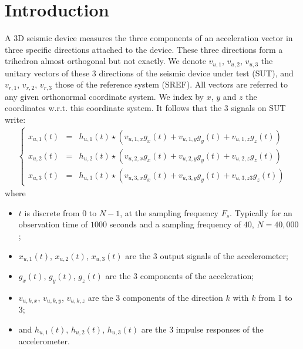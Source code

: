 \documentclass[a4paper, 12pt]{report}
\begin{document}
 \sloppy
\section{Introduction}
A 3D seismic device measures the three components of an acceleration vector in three specific directions attached to the device. These three directions form a trihedron almost orthogonal but not exactly. We denote $v_{u,1}$,  $v_{u,2}$,  $v_{u,3}$ the unitary vectors of these 3 directions of the seismic device under test (SUT), and  $v_{r,1}$,  $v_{r,2}$,  $v_{r,3}$ those of the reference system (SREF). All vectors are referred to any given orthonormal coordinate system. We index by $x$, $y$ and $z$ the coordinates w.r.t. this coordinate system. It follows that the 3 signals on SUT write:
\begin{eqnarray}
\label{eq:signalsT}
\left\{
\begin{array}{rcl}
x_{u,1}(t)&=&h_{u,1}(t)\star (v_{u,1,x}g_{x}(t)+v_{u,1,y}g_{y}(t)+v_{u,1,z}g_{z}(t))
\\
x_{u,2}(t)&=&h_{u,2}(t)\star (v_{u,2,x}g_{x}(t)+v_{u,2,y}g_{y}(t)+v_{u,2,z}g_{z}(t))
\\
x_{u,3}(t)&=&h_{u,3}(t)\star (v_{u,3,x}g_{x}(t)+v_{u,3,y}g_{y}(t)+v_{u,3,z3}g_{z}(t))
\end{array}
\right.
\end{eqnarray}
where 
\begin{itemize}
\item
$t$ is discrete from $0$ to $N-1$, at the sampling frequency $F_{s}$. Typically for an observation time of $1000$ seconds and a sampling frequency of $40$, $N=40,\!000$;
\item
$x_{u,1}(t)$, $x_{u,2}(t)$, $x_{u,3}(t)$  are the 3 output signals of the accelerometer;
\item
$g_{x}(t)$, $g_{y}(t)$, $g_{z}(t)$ are the 3 components  of the acceleration;
\item
$v_{u,k,x}$, $v_{u,k,y}$, $v_{u,k,z}$ are the 3 components of the direction $k$ with $k$ from 1 to 3;
\item
and $h_{u,1}(t)$, $h_{u,2}(t)$, $h_{u,3}(t)$  are the 3 impulse responses of the accelerometer.
\end{itemize}
\end{document}

